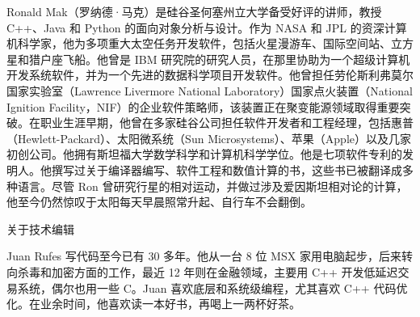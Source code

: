 
Ronald Mak（罗纳德·马克）是硅谷圣何塞州立大学备受好评的讲师，教授 C++、Java 和 Python 的面向对象分析与设计。作为 NASA 和 JPL 的资深计算机科学家，他为多项重大太空任务开发软件，包括火星漫游车、国际空间站、立方星和猎户座飞船。他曾是 IBM 研究院的研究人员，在那里协助为一个超级计算机开发系统软件，并为一个先进的数据科学项目开发软件。他曾担任劳伦斯利弗莫尔国家实验室（Lawrence Livermore National Laboratory）国家点火装置（National Ignition Facility，NIF）的企业软件策略师，该装置正在聚变能源领域取得重要突破。在职业生涯早期，他曾在多家硅谷公司担任软件开发者和工程经理，包括惠普（Hewlett-Packard）、太阳微系统（Sun Microsystems）、苹果（Apple）以及几家初创公司。他拥有斯坦福大学数学科学和计算机科学学位。他是七项软件专利的发明人。他撰写过关于编译器编写、软件工程和数值计算的书，这些书已被翻译成多种语言。尽管 Ron 曾研究行星的相对运动，并做过涉及爱因斯坦相对论的计算，他至今仍然惊叹于太阳每天早晨照常升起、自行车不会翻倒。

关于技术编辑

Juan Rufes 写代码至今已有 30 多年。他从一台 8 位 MSX 家用电脑起步，后来转向杀毒和加密方面的工作，最近 12 年则在金融领域，主要用 C++ 开发低延迟交易系统，偶尔也用一些 C。Juan 喜欢底层和系统级编程，尤其喜欢 C++ 代码优化。在业余时间，他喜欢读一本好书，再喝上一两杯好茶。
